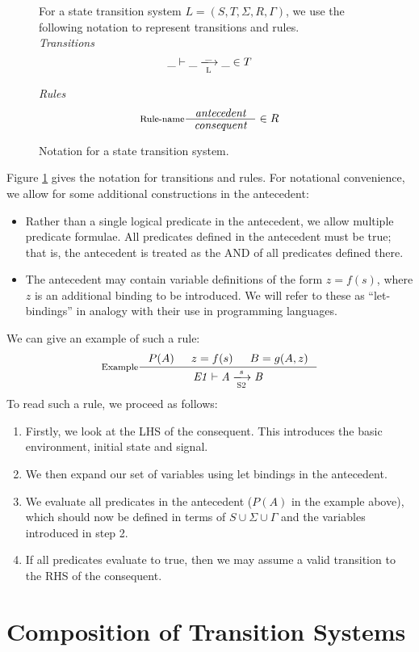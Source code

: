 \documentclass[11pt,a4paper]{article}
\newcommand{\trans}[2]{\xlongrightarrow[\textsc{#1}]{#2}}
\theoremstyle{definition}
\theoremstyle{remark}
\begin{document}
\begin{figure}[h]
  \label{fig:notation}
  For a state transition system $L=(S,T,\Sigma, R, \Gamma)$, we use the
  following notation to represent transitions and rules. \\

  \textit{Transitions}
  \[ \_ \vdash \_ \trans{L}{\_} \_ \in T \]

  \textit{Rules}
  \[ \inference[Rule-name]
     {\textit{antecedent}}
     {\textit{consequent}}
     \in R
  \]
  \caption{Notation for a state transition system.}
\end{figure}
Figure \ref{fig:notation} gives the notation for transitions and rules. For
notational convenience, we allow for some additional constructions in the
antecedent:
\begin{itemize}
  \item Rather than a single logical predicate in the antecedent, we allow
    multiple predicate formulae. All predicates defined in the antecedent must be
    true; that is, the antecedent is treated as the AND of all predicates defined
    there.
  \item The antecedent may contain variable definitions of the form $z=f(s)$,
    where $z$ is an additional binding to be introduced. We will refer to these
    as ``let-bindings'' in analogy with their use in programming languages.
  \end{itemize}
We can give an example of such a rule:
  \[ \inference[Example]
    {P(A) & z = f(s) & B = g(A,z)}
    {\tion[E1]{S2}{A}{s}{B}}
  \]
To read such a rule, we proceed as follows:
\begin{enumerate}
  \item Firstly, we look at the LHS of the consequent. This introduces the basic
    environment, initial state and signal.
  \item We then expand our set of variables using let bindings in the
    antecedent.
  \item We evaluate all predicates in the antecedent ($P(A)$ in the example above), which should now be
    defined in terms of $S\cup\Sigma\cup\Gamma$ and the variables introduced in
    step 2.
  \item If all predicates evaluate to true, then we may assume a valid
    transition to the RHS of the consequent.
\end{enumerate}
\section{Composition of Transition Systems}
\end{document}
